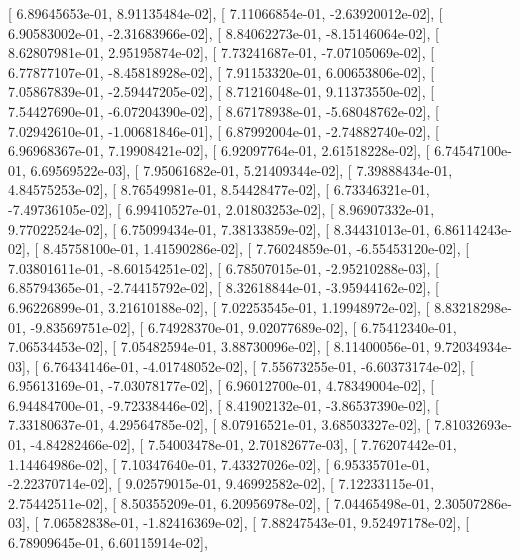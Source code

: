 \documentclass{article}
\begin{document}
       [  6.89645653e-01,   8.91135484e-02],
       [  7.11066854e-01,  -2.63920012e-02],
       [  6.90583002e-01,  -2.31683966e-02],
       [  8.84062273e-01,  -8.15146064e-02],
       [  8.62807981e-01,   2.95195874e-02],
       [  7.73241687e-01,  -7.07105069e-02],
       [  6.77877107e-01,  -8.45818928e-02],
       [  7.91153320e-01,   6.00653806e-02],
       [  7.05867839e-01,  -2.59447205e-02],
       [  8.71216048e-01,   9.11373550e-02],
       [  7.54427690e-01,  -6.07204390e-02],
       [  8.67178938e-01,  -5.68048762e-02],
       [  7.02942610e-01,  -1.00681846e-01],
       [  6.87992004e-01,  -2.74882740e-02],
       [  6.96968367e-01,   7.19908421e-02],
       [  6.92097764e-01,   2.61518228e-02],
       [  6.74547100e-01,   6.69569522e-03],
       [  7.95061682e-01,   5.21409344e-02],
       [  7.39888434e-01,   4.84575253e-02],
       [  8.76549981e-01,   8.54428477e-02],
       [  6.73346321e-01,  -7.49736105e-02],
       [  6.99410527e-01,   2.01803253e-02],
       [  8.96907332e-01,   9.77022524e-02],
       [  6.75099434e-01,   7.38133859e-02],
       [  8.34431013e-01,   6.86114243e-02],
       [  8.45758100e-01,   1.41590286e-02],
       [  7.76024859e-01,  -6.55453120e-02],
       [  7.03801611e-01,  -8.60154251e-02],
       [  6.78507015e-01,  -2.95210288e-03],
       [  6.85794365e-01,  -2.74415792e-02],
       [  8.32618844e-01,  -3.95944162e-02],
       [  6.96226899e-01,   3.21610188e-02],
       [  7.02253545e-01,   1.19948972e-02],
       [  8.83218298e-01,  -9.83569751e-02],
       [  6.74928370e-01,   9.02077689e-02],
       [  6.75412340e-01,   7.06534453e-02],
       [  7.05482594e-01,   3.88730096e-02],
       [  8.11400056e-01,   9.72034934e-03],
       [  6.76434146e-01,  -4.01748052e-02],
       [  7.55673255e-01,  -6.60373174e-02],
       [  6.95613169e-01,  -7.03078177e-02],
       [  6.96012700e-01,   4.78349004e-02],
       [  6.94484700e-01,  -9.72338446e-02],
       [  8.41902132e-01,  -3.86537390e-02],
       [  7.33180637e-01,   4.29564785e-02],
       [  8.07916521e-01,   3.68503327e-02],
       [  7.81032693e-01,  -4.84282466e-02],
       [  7.54003478e-01,   2.70182677e-03],
       [  7.76207442e-01,   1.14464986e-02],
       [  7.10347640e-01,   7.43327026e-02],
       [  6.95335701e-01,  -2.22370714e-02],
       [  9.02579015e-01,   9.46992582e-02],
       [  7.12233115e-01,   2.75442511e-02],
       [  8.50355209e-01,   6.20956978e-02],
       [  7.04465498e-01,   2.30507286e-03],
       [  7.06582838e-01,  -1.82416369e-02],
       [  7.88247543e-01,   9.52497178e-02],
       [  6.78909645e-01,   6.60115914e-02],
\end{document}
